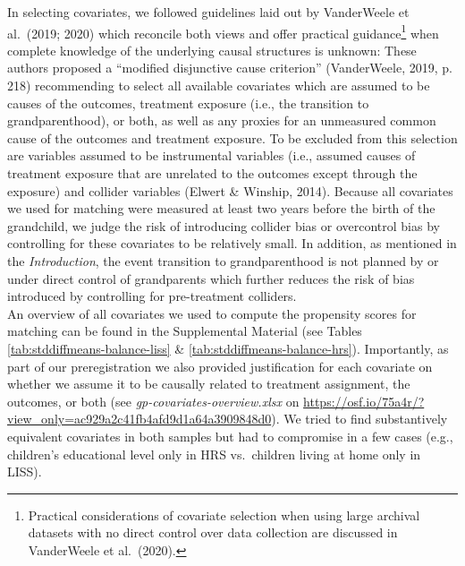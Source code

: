 \documentclass[
  english,
  man, noextraspace]{apa7}
\begin{document}
In selecting covariates, we followed guidelines laid out by VanderWeele et al.~(2019; 2020) which reconcile both views and offer practical guidance\footnote{Practical considerations of covariate selection when using large archival datasets with no direct control over data collection are discussed in VanderWeele et al.~(2020).} when complete knowledge of the underlying causal structures is unknown: These authors proposed a \enquote{modified disjunctive cause criterion} (VanderWeele, 2019, p. 218) recommending to select all available covariates which are assumed to be causes of the outcomes, treatment exposure (i.e., the transition to grandparenthood), or both, as well as any proxies for an unmeasured common cause of the outcomes and treatment exposure. To be excluded from this selection are variables assumed to be instrumental variables (i.e., assumed causes of treatment exposure that are unrelated to the outcomes except through the exposure) and collider variables (Elwert \& Winship, 2014). Because all covariates we used for matching were measured at least two years before the birth of the grandchild, we judge the risk of introducing collider bias or overcontrol bias by controlling for these covariates to be relatively small. In addition, as mentioned in the \emph{Introduction}, the event transition to grandparenthood is not planned by or under direct control of grandparents which further reduces the risk of bias introduced by controlling for pre-treatment colliders.\\
An overview of all covariates we used to compute the propensity scores for matching can be found in the Supplemental Material (see Tables \ref{tab:stddiffmeans-balance-liss} \& \ref{tab:stddiffmeans-balance-hrs}). Importantly, as part of our preregistration we also provided justification for each covariate on whether we assume it to be causally related to treatment assignment, the outcomes, or both (see \emph{gp-covariates-overview.xlsx} on \url{https://osf.io/75a4r/?view_only=ac929a2c41fb4afd9d1a64a3909848d0}). We tried to find substantively equivalent covariates in both samples but had to compromise in a few cases (e.g., children's educational level only in HRS vs.~children living at home only in LISS).\\
\end{document}

